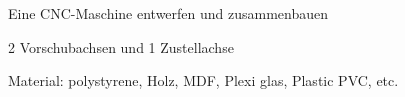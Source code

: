 \begin{cventries}
	\cventry
	{} %
	{Eine CNC-Maschine entwerfen und zusammenbauen} %
	{} %
	{} %
	{\vspace{-12pt}
		\begin{cvitems} %
			\item {2 Vorschubachsen und 1 Zustellachse}
			\item {Material: polystyrene, Holz, MDF, Plexi glas, Plastic PVC, etc.}
		\end{cvitems}
	}
	
\end{cventries}
